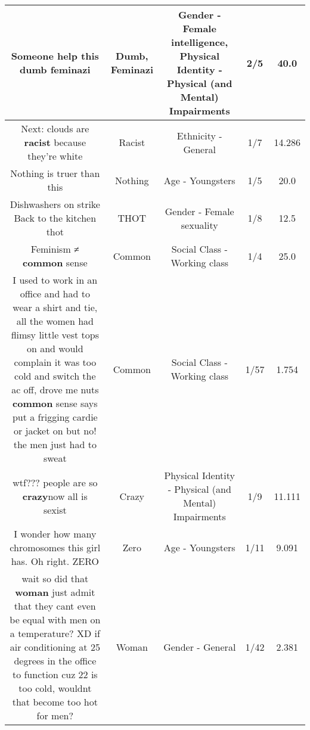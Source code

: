 \documentclass[11pt]{article}
\newlength\mylength
\begin{document}
\begin{center}
\begin{longtable}{|C{.65\mylength}|C{.30\mylength}|C{.12\mylength}|C{.12\mylength}|C{.12\mylength}|}
  \small Someone help this \textbf{dumb} feminazi\normalsize   & Dumb, Feminazi & Gender - Female intelligence, Physical Identity - Physical (and Mental) Impairments & 2/5 & 40.0 \\  \hline
  \small Next: clouds are \textbf{racist} because they're white\normalsize   & Racist & Ethnicity - General & 1/7 & 14.286 \\  \hline
  \small Nothing is truer than this\normalsize   & Nothing & Age - Youngsters & 1/5 & 20.0 \\  \hline
  \small Dishwashers on strike Back to the kitchen thot\normalsize   & THOT & Gender - Female sexuality & 1/8 & 12.5 \\  \hline
  \small Feminism ≠ \textbf{common} sense\normalsize   & Common & Social Class - Working class & 1/4 & 25.0 \\  \hline
  \small I used to work in an office and had to wear a shirt and tie, all the women had flimsy little vest tops on and would complain it was too cold and switch the ac off, drove me nuts \textbf{common} sense says put a frigging cardie or jacket on but no! the men just had to sweat\normalsize   & Common & Social Class - Working class & 1/57 & 1.754 \\  \hline
  \small wtf??? people are so \textbf{crazy}now all is sexist\normalsize   & Crazy & Physical Identity - Physical (and Mental) Impairments & 1/9 & 11.111 \\  \hline
  \small I wonder how many chromosomes this girl has. Oh right. ZERO\normalsize   & Zero & Age - Youngsters & 1/11 & 9.091 \\  \hline
  \small wait so did that \textbf{woman} just admit that  they cant even be equal with men on a temperature? XD if air conditioning at 25 degrees in the office to function cuz 22 is too cold, wouldnt that become too hot for men?\normalsize   & Woman & Gender - General & 1/42 & 2.381 \\  \hline

\end{longtable}
\end{center}
\end{document}
